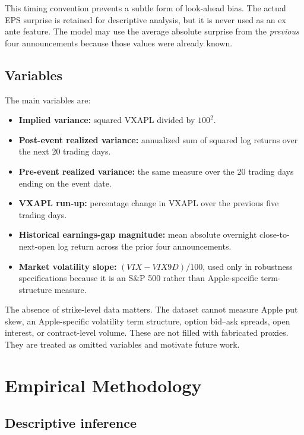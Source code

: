 \documentclass[11pt]{article}
\begin{document}
This timing convention prevents a subtle form of look-ahead bias. The actual EPS surprise is retained for descriptive analysis, but it is never used as an ex ante feature. The model may use the average absolute surprise from the \emph{previous} four announcements because those values were already known.

\subsection{Variables}

The main variables are:

\begin{itemize}[leftmargin=1.5em]
    \item \textbf{Implied variance:} squared VXAPL divided by $100^2$.
    \item \textbf{Post-event realized variance:} annualized sum of squared log returns over the next 20 trading days.
    \item \textbf{Pre-event realized variance:} the same measure over the 20 trading days ending on the event date.
    \item \textbf{VXAPL run-up:} percentage change in VXAPL over the previous five trading days.
    \item \textbf{Historical earnings-gap magnitude:} mean absolute overnight close-to-next-open log return across the prior four announcements.
    \item \textbf{Market volatility slope:} $(VIX-VIX9D)/100$, used only in robustness specifications because it is an S\&P 500 rather than Apple-specific term-structure measure.
\end{itemize}

The absence of strike-level data matters. The dataset cannot measure Apple put skew, an Apple-specific volatility term structure, option bid--ask spreads, open interest, or contract-level volume. These are not filled with fabricated proxies. They are treated as omitted variables and motivate future work.



\section{Empirical Methodology}

\subsection{Descriptive inference}
\end{document}
